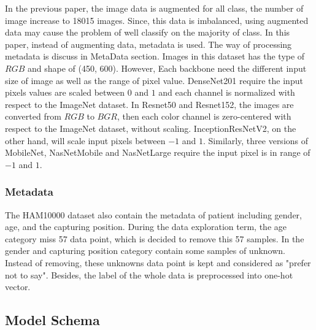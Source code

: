 In the previous paper\cite{03358}, the image data is augmented for all class, the number of image increase to 18015 images. Since, this data is imbalanced, using augmented data may cause the problem of well classify on the majority of class. In this paper, instead of augmenting data, metadata is used. The way of processing metadata is discuss in MetaData section. Images in this dataset has the type of $RGB$ and shape of (450, 600). However, Each backbone need the different input size of image as well as the range of pixel value. DenseNet201\cite{06993} require the input pixels values are scaled between $0$ and $1$ and each channel is normalized with respect to the ImageNet dataset. In Resnet50 and Resnet152\cite{03385}\cite{05027}, the images are converted from $RGB$ to $BGR$, then each color channel is zero-centered with respect to the ImageNet dataset, without scaling. InceptionResNetV2\cite{11946}, on the other hand, will scale input pixels between $-1$ and $1$. Similarly, three versions of MobileNet\cite{04861}\cite{04381}\cite{02244}, NasNetMobile and NasNetLarge\cite{07012} require the input pixel is in range of $-1$ and $1$. 
\subsubsection{Metadata}
The HAM10000 dataset\cite{10417} also contain the metadata of patient including gender, age, and the capturing position. During the data exploration term, the age category miss 57 data point, which is decided to remove this 57 samples. In the gender and capturing position category contain some samples of unknown. Instead of removing, these unknowns data point is kept and considered as "prefer not to say". Besides, the label of the whole data is preprocessed into one-hot vector.
\subsection{Model Schema}
